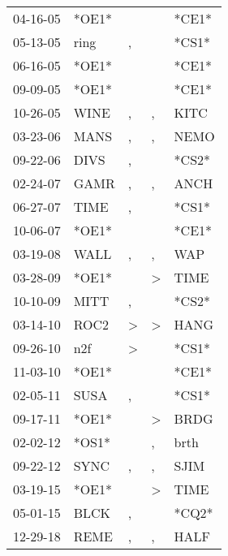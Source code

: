 \begin{supertabular}{lllll}
 04-16-05 &  *OE1* &               &               &  *CE1* \\
 05-13-05 &   ring &             , &               &  *CS1* \\
 06-16-05 &  *OE1* &               &               &  *CE1* \\
 09-09-05 &  *OE1* &               &               &  *CE1* \\
 10-26-05 &   WINE &             , &             , &   KITC \\
 03-23-06 &   MANS &             , &             , &   NEMO \\
 09-22-06 &   DIVS &             , &               &  *CS2* \\
 02-24-07 &   GAMR &             , &             , &   ANCH \\
 06-27-07 &   TIME &             , &               &  *CS1* \\
 10-06-07 &  *OE1* &               &               &  *CE1* \\
 03-19-08 &   WALL &             , &             , &    WAP \\
 03-28-09 &  *OE1* &               &  \textgreater &   TIME \\
 10-10-09 &   MITT &             , &               &  *CS2* \\
 03-14-10 &   ROC2 &  \textgreater &  \textgreater &   HANG \\
 09-26-10 &    n2f &  \textgreater &               &  *CS1* \\
 11-03-10 &  *OE1* &               &               &  *CE1* \\
 02-05-11 &   SUSA &             , &               &  *CS1* \\
 09-17-11 &  *OE1* &               &  \textgreater &   BRDG \\
 02-02-12 &  *OS1* &               &             , &   brth \\
 09-22-12 &   SYNC &             , &             , &   SJIM \\
 03-19-15 &  *OE1* &               &  \textgreater &   TIME \\
 05-01-15 &   BLCK &             , &               &  *CQ2* \\
 12-29-18 &   REME &             , &             , &   HALF \\
\end{supertabular}
